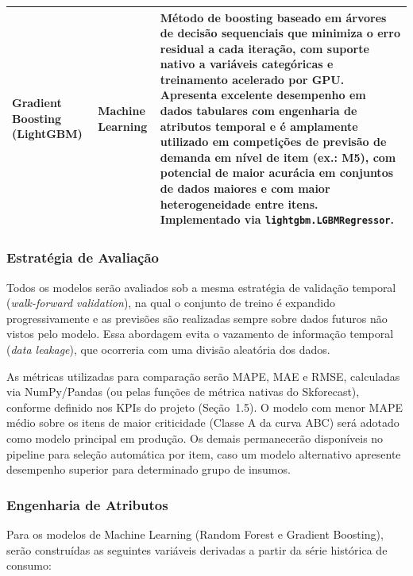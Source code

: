 \documentclass[12pt,a4paper]{article}
\begin{document}
\begin{longtable}{p{} p{} p{}}
    Gradient Boosting \newline (LightGBM)                 &
    Machine Learning                                      &
    Método de boosting baseado em árvores de decisão sequenciais que minimiza
    o erro residual a cada iteração, com suporte nativo a variáveis
    categóricas e treinamento acelerado por GPU. Apresenta excelente
    desempenho em dados tabulares com engenharia de atributos temporal e
    é amplamente utilizado em competições de previsão de demanda em nível
    de item (ex.: M5), com potencial de maior acurácia em conjuntos de
    dados maiores e com maior heterogeneidade entre itens.
    Implementado via \texttt{lightgbm.LGBMRegressor}.                                                               \\

    \bottomrule
\end{longtable}

\subsubsection{Estratégia de Avaliação}

Todos os modelos serão avaliados sob a mesma estratégia de validação
temporal (\textit{walk-forward validation}), na qual o conjunto de treino
é expandido progressivamente e as previsões são realizadas sempre sobre
dados futuros não vistos pelo modelo. Essa abordagem evita o vazamento
de informação temporal (\textit{data leakage}), que ocorreria com uma
divisão aleatória dos dados.

\vspace{0.3cm}
\noindent As métricas utilizadas para comparação serão MAPE, MAE e RMSE,
calculadas via NumPy/Pandas (ou pelas funções de métrica nativas do
Skforecast), conforme definido nos KPIs do projeto (Seção~1.5). O modelo
com menor MAPE médio sobre os itens de maior criticidade (Classe A da
curva ABC)
será adotado como modelo principal em produção. Os demais permanecerão
disponíveis no pipeline para seleção automática por item, caso um modelo
alternativo apresente desempenho superior para determinado grupo de
insumos.

\subsubsection{Engenharia de Atributos}

Para os modelos de Machine Learning (Random Forest e Gradient Boosting),
serão construídas as seguintes variáveis derivadas a partir da série
histórica de consumo:
\end{document}
